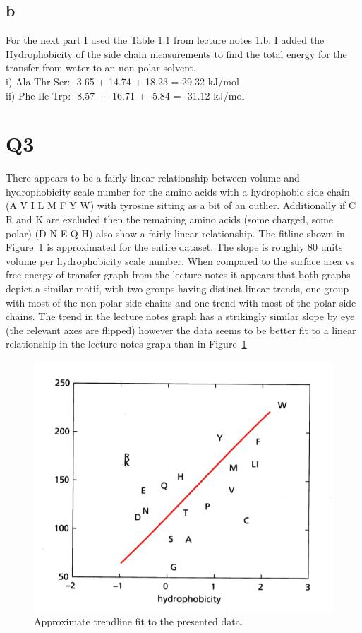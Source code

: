 \documentclass[12pt]{article}
\begin{document}
\subsection{b}
For the next part I used the Table 1.1 from lecture notes 1.b. I added the Hydrophobicity of the side chain measurements to find the total energy for the transfer from water to an non-polar solvent.\\
i) Ala-Thr-Ser: -3.65 + 14.74 + 18.23 = 29.32 kJ/mol\\
ii) Phe-Ile-Trp: -8.57 + -16.71 + -5.84 = -31.12 kJ/mol\\


\section{Q3}
There appears to be a fairly linear relationship between volume and hydrophobicity scale number for the amino acids with a hydrophobic side chain (A V I L M F Y W) with tyrosine sitting as a bit of an outlier. Additionally if C R and K are excluded then the remaining amino acids (some charged, some polar) (D N E Q H) also show a fairly linear relationship. The fitline shown in Figure~\ref{fig:trend} is approximated for the entire dataset. The slope is roughly 80 units volume per hydrophobicity scale number. When compared to the surface area vs free energy of transfer graph from the lecture notes it appears that both graphs depict a similar motif, with two groups having distinct linear trends, one group with most of the non-polar side chains and one trend with most of the polar side chains. The trend in the lecture notes graph has a strikingly similar slope by eye (the relevant axes are flipped) however the data seems to be  better fit to a linear relationship in the lecture notes graph than in Figure~\ref{fig:trend}
\begin{figure}[H]
	
	\centering
	\includegraphics[width=.95\textwidth]{Trend.png}
	
	\caption{Approximate trendline fit to the presented data.}
	\label{fig:trend}
\end{figure}
\end{document}
